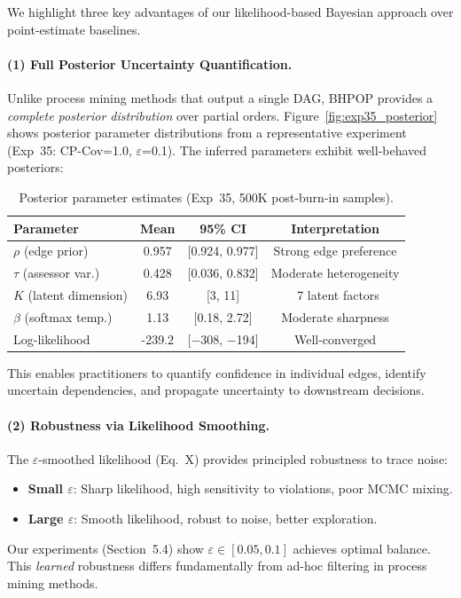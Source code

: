 We highlight three key advantages of our likelihood-based Bayesian approach over point-estimate baselines.

\paragraph{(1) Full Posterior Uncertainty Quantification.}
Unlike process mining methods that output a single DAG, \textsc{BHPOP} provides a \emph{complete posterior distribution} over partial orders. Figure~\ref{fig:exp35_posterior} shows posterior parameter distributions from a representative experiment (Exp~35: CP-Cov=1.0, $\varepsilon$=0.1). The inferred parameters exhibit well-behaved posteriors:

\begin{table}[htbp]
\caption{Posterior parameter estimates (Exp~35, 500K post-burn-in samples).}
\label{tab:posterior_params}
\centering
\small
\begin{tabular}{lccc}
\toprule
\textbf{Parameter} & \textbf{Mean} & \textbf{95\% CI} & \textbf{Interpretation} \\
\midrule
$\rho$ (edge prior) & 0.957 & [0.924, 0.977] & Strong edge preference \\
$\tau$ (assessor var.) & 0.428 & [0.036, 0.832] & Moderate heterogeneity \\
$K$ (latent dimension) & 6.93 & [3, 11] & ~7 latent factors \\
$\beta$ (softmax temp.) & 1.13 & [0.18, 2.72] & Moderate sharpness \\
\midrule
Log-likelihood & -239.2 & [$-$308, $-$194] & Well-converged \\
\bottomrule
\end{tabular}
\end{table}

This enables practitioners to quantify confidence in individual edges, identify uncertain dependencies, and propagate uncertainty to downstream decisions.

\paragraph{(2) Robustness via Likelihood Smoothing.}
The $\varepsilon$-smoothed likelihood (Eq.~X) provides principled robustness to trace noise:
\begin{itemize}[leftmargin=*,nosep]
    \item \textbf{Small $\varepsilon$}: Sharp likelihood, high sensitivity to violations, poor MCMC mixing.
    \item \textbf{Large $\varepsilon$}: Smooth likelihood, robust to noise, better exploration.
\end{itemize}
Our experiments (Section~5.4) show $\varepsilon \in [0.05, 0.1]$ achieves optimal balance. This \emph{learned} robustness differs fundamentally from ad-hoc filtering in process mining methods.


